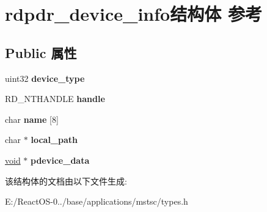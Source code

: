 \hypertarget{structrdpdr__device__info}{}\section{rdpdr\+\_\+device\+\_\+info结构体 参考}
\label{structrdpdr__device__info}
\subsection*{Public 属性}
\begin{DoxyCompactItemize}
\item 
\mbox{\label{structrdpdr__device__info_a62192bd52c4ea36edc8b555a6ca8af9b}} 
uint32 {\bfseries device\+\_\+type}
\item 
\mbox{\label{structrdpdr__device__info_af6b396aa1a9b957bad012ffb78dc06d1}} 
R\+D\+\_\+\+N\+T\+H\+A\+N\+D\+LE {\bfseries handle}
\item 
\mbox{\label{structrdpdr__device__info_ab3db8238806ad2cd4a6c900a6a868fc7}} 
char {\bfseries name} \mbox{[}8\mbox{]}
\item 
\mbox{\label{structrdpdr__device__info_aa6c8ee3a332005da5a1e3c43a65e6c5a}} 
char $\ast$ {\bfseries local\+\_\+path}
\item 
\mbox{\label{structrdpdr__device__info_ae0f8b57e8e9e20e9e8c2d605821ac11c}} 
\hyperlink{interfacevoid}{void} $\ast$ {\bfseries pdevice\+\_\+data}
\end{DoxyCompactItemize}


该结构体的文档由以下文件生成\+:\begin{DoxyCompactItemize}
\item 
E\+:/\+React\+O\+S-\/0../base/applications/mstsc/types.\+h\end{DoxyCompactItemize}

